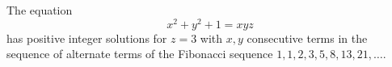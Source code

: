 \begin{proposition}\label{eq:117}
    The equation
\[
    x^2+y^2+1=xyz
\]
    has positive integer solutions for $z=3$ with $x,y$ consecutive terms in the sequence of alternate terms of the Fibonacci sequence $1,1,2,3,5,8,13,21,\ldots$.
\end{proposition}
